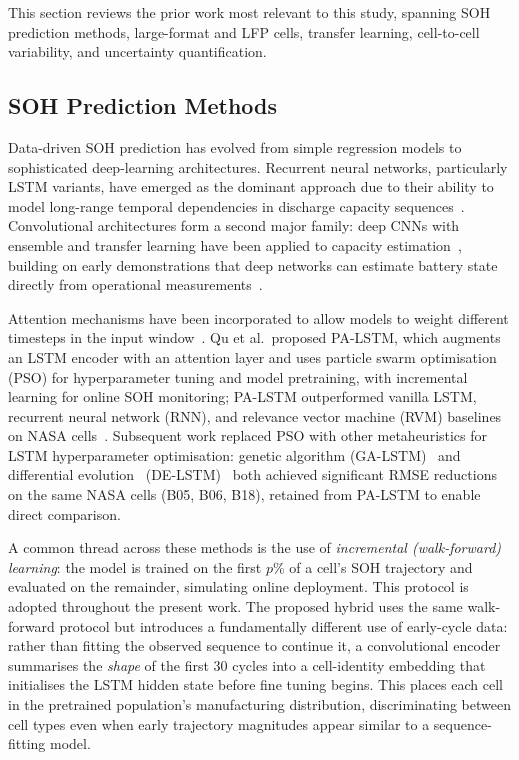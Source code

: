 This section reviews the prior work most relevant to this study, spanning
SOH prediction methods, large-format and LFP cells, transfer learning,
cell-to-cell variability, and uncertainty quantification.

\subsection{SOH Prediction Methods}

Data-driven SOH prediction has evolved from simple regression models to
sophisticated deep-learning architectures.
Recurrent neural networks, particularly LSTM variants, have emerged as
the dominant approach due to their ability to model long-range temporal
dependencies in discharge capacity sequences~\cite{zhang2018long}.
Convolutional architectures form a second major family: deep CNNs with
ensemble and transfer learning have been applied to capacity
estimation~\cite{shen2022deep,li2020lithium}, building on early
demonstrations that deep networks can estimate battery state directly from
operational measurements~\cite{chemali2018state}.

Attention mechanisms have been incorporated to allow models to weight
different timesteps in the input window~\cite{bahdanau2015neural}.
Qu et al.\ proposed PA-LSTM, which augments an LSTM encoder with an
attention layer and uses particle swarm optimisation (PSO) for hyperparameter
tuning and model pretraining, with incremental learning for online SOH
monitoring; PA-LSTM outperformed vanilla LSTM, recurrent neural network (RNN), and relevance vector machine (RVM) baselines on
NASA cells~\cite{qu2019neural}.
Subsequent work replaced PSO with other metaheuristics for LSTM hyperparameter
optimisation: genetic algorithm (GA-LSTM)~\cite{ponnambalam2024battery}
and differential evolution~\cite{storn1997differential}
(DE-LSTM)~\cite{ponnambalam2026delstm} both
achieved significant RMSE reductions on the same NASA cells (B05, B06, B18),
retained from PA-LSTM to enable direct comparison.

A common thread across these methods is the use of \textit{incremental
(walk-forward) learning}: the model is trained on the first $p$\% of a cell's
SOH trajectory and evaluated on the remainder, simulating online deployment.
This protocol is adopted throughout the present work.
The proposed hybrid uses the same walk-forward protocol but introduces a
fundamentally different use of early-cycle data: rather than fitting the
observed sequence to continue it, a convolutional encoder summarises the
\textit{shape} of the first 30 cycles into a cell-identity embedding that
initialises the LSTM hidden state before fine tuning begins.
This places each cell in the pretrained population's manufacturing
distribution, discriminating between cell types even when early trajectory
magnitudes appear similar to a sequence-fitting model.

